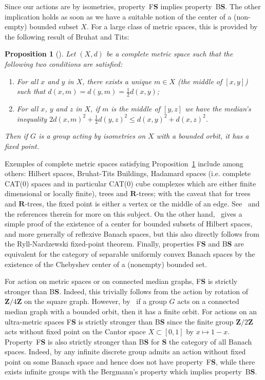 \documentclass[a4paper]{article}
\newtheorem{prop}[lem]{Proposition}
\theoremstyle{definition}
\newcommand*{\field}[1]{\mathbf{#1}}
\newcommand*{\category}[1]{\textbf{#1}}
\newcommand*{\CatS}{\category{S}}
\newcommand*{\Z}{\field{Z}}
\newcommand*{\R}{\field{R}}
\newcommand*{\BS}{B\textbf{S}}
\newcommand*{\FS}{F\textbf{S}}
\begin{document}
Since our actions are by isometries, property~\FS{} implies property~\BS. The other implication holds as soon as we have a suitable notion of the center of a (non-empty) bounded subset $X$.
For a large class of metric spaces, this is provided by the following result of Bruhat and Tits:
%
%
\begin{prop}[{\cite[Chapter 3.b]{MR1023471}}]\label{Proposition:Mediane}
Let $(X,d)$ be a complete metric space such that the following two conditions are satisfied:
\begin{enumerate}
\item For all $x$ and $y$ in $X$, there exists a unique $m\in X$ (the middle of $[x,y]$) such that $d(x,m)=d(y,m)=\frac12d(x,y)$;
\item For all $x$, $y$ and $z$ in $X$, if $m$ is the middle of $[y,z]$ we have the median's inequality  $2d(x,m)^2+\frac12d(y,z)^2\leq d(x,y)^2+d(x,z)^2$.
\end{enumerate}
Then if $G$ is a group acting by isometries on $X$ with a bounded orbit, it has a fixed point.
\end{prop}
%
%
Exemples of complete metric spaces satisfying Proposition~\ref{Proposition:Mediane} include among others: Hilbert spaces, Bruhat-Tits Buildings, Hadamard spaces (i.e. complete CAT(0) spaces and in particular CAT(0) cube complexes which are either finite dimensional or locally finite), trees and $\R$-trees; with the caveat that for trees and $\R$-trees, the fixed point is either a vertex or the middle of an edge.
See~\cite[Chapter 3.b]{MR1023471} and the references therein for more on this subject.
On the other hand,~\cite[Lemma 2.2.7]{MR2415834} gives a simple proof of the existence of a center for bounded subsets of Hilbert spaces, and more generally of reflexive Banach spaces, but this also directly follows from the Ryll-Nardzewski fixed-point theorem.
Finally, properties \FS{} and \BS{} are equivalent for the category of separable  uniformly  convex Banach  spaces by the existence of the Chebyshev center of a (nonempty) bounded set.

For action on metric spaces or on connected median graphs, \FS{} is strictly stronger than \BS.
Indeed, this trivially follows from the action by rotation of $\Z/4\Z$ on the square graph.
However,  by~\cite{Rol98,MR1663779} if a group $G$ acts on a connected median graph with a bounded orbit, then it has a finite orbit.
For actions on an ultra-metric spaces \FS{} is strictly stronger than \BS{} since the finite group  $\Z/2\Z$ acts without fixed point on the Cantor space $X\subset[0,1]$ by $x\mapsto 1-x$.
Property~\FS{} is also strictly stronger than \BS{} for \CatS{} the category of all Banach spaces. Indeed, by \cite{MR2656670} any infinite discrete group admits an action without fixed point on some Banach space and hence does not have property~\FS, while there exists infinite groups with the Bergmann's property which implies property~\BS.
%
%
%
%
%
\end{document}
